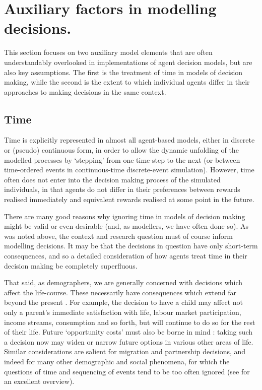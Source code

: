 \documentclass{article}
\begin{document}
\section{Auxiliary factors in modelling
decisions.}\label{auxiliary-factors-in-modelling-decisions}

This section focuses on two auxiliary model elements that are often understandably overlooked in implementations of agent decision models, but are also key assumptions. The first is the treatment of time in models of decision making, while the second is the extent to which individual agents differ in their approaches to making decisions in the same context.

\subsection{Time}\label{time}

Time is explicitly represented in almost all agent-based models, either in discrete or (pseudo) continuous form, in order to allow the dynamic unfolding of the modelled processes by `stepping' from one time-step to the next (or between time-ordered events in continuous-time discrete-event simulation). However, time often  does not enter into the decision making process of the simulated individuals, in that agents do not differ in their preferences between rewards realised immediately and equivalent rewards realised at some point in the future. 

There are many good reasons why ignoring time in models of decision making might be valid or even desirable (and, as modellers, we have often done so). As was noted above, the context and research question must of course inform modelling decisions. It may be that the decisions in question have only short-term consequences, and so a detailed consideration of how agents treat time in their decision making be completely superfluous.

That said, as demographers, we are generally concerned with decisions which affect the life-course. These necessarily have consequences which extend far beyond the present \citep{Willekens2001}. For example, the decision to have a child may affect not only a parent's immediate satisfaction with life, labour market participation, income streams, consumption and so forth, but will continue to do so for the rest of their life. Future `opportunity costs' must also be borne in mind \citep{Butz1979}: taking such a decision now may widen or narrow future options in various other areas of life. Similar considerations are salient for migration and partnership decisions, and indeed for many other demographic and social phenomena, for which the questions of time and sequencing of events tend to be too often ignored (see \citet{Abbott2001} for an excellent overview).
\end{document}
